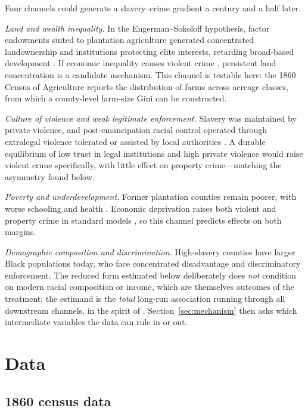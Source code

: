 \documentclass[12pt]{article}
\begin{document}
Four channels could generate a slavery--crime gradient a century and a half later.

\emph{Land and wealth inequality.} In the Engerman--Sokoloff hypothesis, factor endowments suited to plantation agriculture generated concentrated landownership and institutions protecting elite interests, retarding broad-based development \citep{engerman2002, nunn2008americas}. If economic inequality causes violent crime \citep{kelly2000, fajnzylber2002}, persistent land concentration is a candidate mechanism. This channel is testable here: the 1860 Census of Agriculture reports the distribution of farms across acreage classes, from which a county-level farm-size Gini can be constructed.

\emph{Culture of violence and weak legitimate enforcement.} Slavery was maintained by private violence, and post-emancipation racial control operated through extralegal violence tolerated or assisted by local authorities \citep{tolnay1995}. A durable equilibrium of low trust in legal institutions and high private violence would raise violent crime specifically, with little effect on property crime---matching the asymmetry found below.

\emph{Poverty and underdevelopment.} Former plantation counties remain poorer, with worse schooling and health \citep{oconnell2012, bertocchi2014}. Economic deprivation raises both violent and property crime in standard models \citep{becker1968}, so this channel predicts effects on both margins.

\emph{Demographic composition and discrimination.} High-slavery counties have larger Black populations today, who face concentrated disadvantage and discriminatory enforcement. The reduced form estimated below deliberately does \emph{not} condition on modern racial composition or income, which are themselves outcomes of the treatment; the estimand is the \emph{total} long-run association running through all downstream channels, in the spirit of \citet{abs2016}. Section~\ref{sec:mechanism} then asks which intermediate variables the data can rule in or out.

\section{Data}\label{sec:data}

\subsection{1860 census data}
\end{document}
